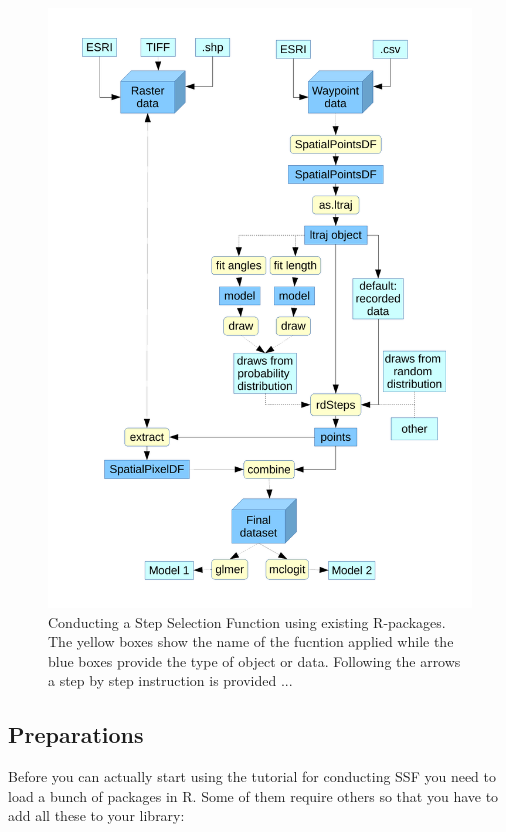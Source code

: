 \documentclass[11pt, a4paper]{article}\usepackage[]{graphicx}\usepackage[]{color}
\begin{document}
\begin{figure} %
\captionsetup{width=1\textwidth}
\centering
\includegraphics[width=1\textwidth]{Flowchart.pdf} %
\caption{Conducting a Step Selection Function using existing R-packages. The yellow boxes show the name of the fucntion applied while the blue boxes provide the type of object or data. Following the arrows a step by step instruction is provided ...}
\label{fig:Flowchart}
\end{figure}




\subsection{Preparations}
Before you can actually start using the tutorial for conducting SSF you need to load a bunch of packages in R. Some of them require others so that you have to add all these to your library:
\end{document}
